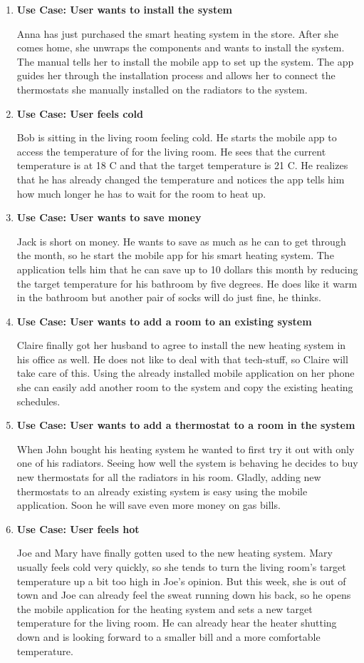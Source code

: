 \begin{enumerate}
\item \textbf{Use Case: User wants to install the system}

Anna has just purchased the smart heating system in the store. After she comes home, she unwraps the components and wants to install the system. The manual tells her to install the mobile app to set up the system. The app guides her through the installation process and allows her to connect the thermostats she manually installed on the radiators to the system.
\item \textbf{Use Case: User feels cold}

Bob is sitting in the living room feeling cold. He starts the mobile app to access the temperature of for the living room. He sees that the current temperature is at 18 C and that the target temperature is 21 C. He realizes that he has already changed the temperature and notices the app tells him how much longer he has to wait for the room to heat up.
\item \textbf{Use Case: User wants to save money}

Jack is short on money. He wants to save as much as he can to get through the month, so he start the mobile app for his smart heating system. The application tells him that he can save up to 10 dollars this month by reducing the target temperature for his bathroom by five degrees. He does like it warm in the bathroom but another pair of socks will do just fine, he thinks.
\item \textbf{Use Case: User wants to add a room to an existing system}

Claire finally got her husband to agree to install the new heating system in his office as well. He does not like to deal with that tech-stuff, so Claire will take care of this. Using the already installed mobile application on her phone she can easily add another room to the system and copy the existing heating schedules.
\item \textbf{Use Case: User wants to add a thermostat to a room in the system}

When John bought his heating system he wanted to first try it out with only one of his radiators. Seeing how well the system is behaving he decides to buy new thermostats for all the radiators in his room. Gladly, adding new thermostats to an already existing system is easy using the mobile application. Soon he will save even more money on gas bills.
\item \textbf{Use Case: User feels hot}

Joe and Mary have finally gotten used to the new heating system. Mary usually feels cold very quickly, so she tends to turn the living room's target temperature up a bit too high in Joe's opinion. But this week, she is out of town and Joe can already feel the sweat running down his back, so he opens the mobile application for the heating system and sets a new target temperature for the living room. He can already hear the heater shutting down and is looking forward to a smaller bill and a more comfortable temperature.
\end{enumerate}

